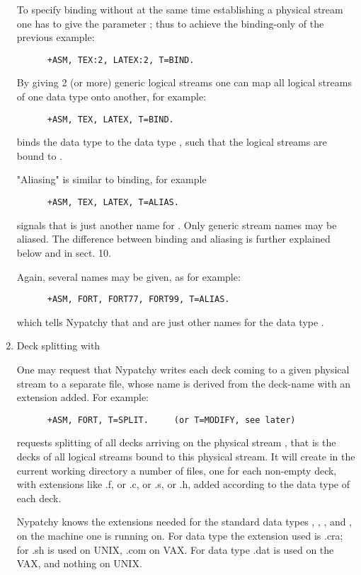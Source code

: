 \begin{enumerate}
To specify binding without at the same time establishing a physical stream
one has to give the parameter ; thus to achieve the binding-only
of the previous example:
\begin{verbatim}
      +ASM, TEX:2, LATEX:2, T=BIND.
\end{verbatim}
By giving 2 (or more) generic logical streams one can map all logical
streams of one data type onto another, for example:
\begin{verbatim}
      +ASM, TEX, LATEX, T=BIND.
\end{verbatim}
binds the data type  to the data type , such that
the logical streams  are bound to .

"Aliasing" is similar to binding, for example
\begin{verbatim}
      +ASM, TEX, LATEX, T=ALIAS.
\end{verbatim}
signals that  is just another name for .
Only generic stream names may be aliased.
The difference between binding and aliasing is
further explained below and in sect. 10.

Again, several names may be given, as for example:
\begin{verbatim}
      +ASM, FORT, FORT77, FORT99, T=ALIAS.
\end{verbatim}
which tells Nypatchy that  and  are just other
names for the data type .

\item
Deck splitting with 

One may request that Nypatchy writes each deck coming to a given physical
stream to a separate file, whose name is derived from the deck-name with
an extension added. For example:
\begin{verbatim}
      +ASM, FORT, T=SPLIT.     (or T=MODIFY, see later)
\end{verbatim}
requests splitting of all decks arriving on the physical stream ,
that is the decks of all logical streams bound to this physical stream.
It will create in the current working directory a number of files,
one for each non-empty deck, with extensions like
.f, or .c, or .s, or .h, added
according to the data type of each deck.

Nypatchy knows the extensions needed for the standard data types
, ,
, and , on the machine one is running on.
For data type  the
extension used is .cra; for  .sh is used on UNIX, .com on VAX.
For data type  .dat is used on the VAX, and nothing on UNIX.


\end{enumerate}
